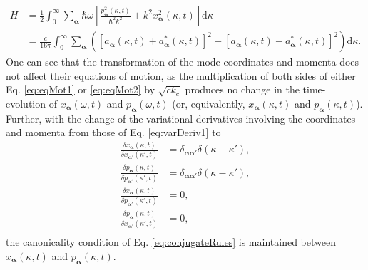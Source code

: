 \documentclass{article}
\numberwithin{equation}{section}
\begin{document}
\begin{equation}
\begin{split}
H &= \frac{1}{2}\int_0^\infty\sum_{\bm{\alpha}}\hbar\omega\left[\frac{p_{\bm{\alpha}}^2(\kappa,t)}{\hbar^2k^2} + k^2x_{\bm{\alpha}}^2(\kappa,t)\right]\mathrm{d}\kappa\\
&= \frac{c}{16\pi}\int_0^\infty\sum_{\bm{\alpha}}\left(\left[a_{\bm{\alpha}}(\kappa,t) + a_{\bm{\alpha}}^*(\kappa,t)\right]^2 - \left[a_{\bm{\alpha}}(\kappa,t) - a_{\bm{\alpha}}^*(\kappa,t)\right]^2\right)\mathrm{d}\kappa.
\end{split}
\end{equation}
One can see that the transformation of the mode coordinates and momenta does not affect their equations of motion, as the multiplication of both sides of either Eq. \eqref{eq:eqMot1} or \eqref{eq:eqMot2} by $\sqrt{ck_c}$ produces no change in the time-evolution of $x_{\bm{\alpha}}(\omega,t)$ and $p_{\bm{\alpha}}(\omega,t)$ (or, equivalently, $x_{\bm{\alpha}}(\kappa,t)$ and $p_{\bm{\alpha}}(\kappa,t)$). Further, with the change of the variational derivatives involving the coordinates and momenta from those of Eq. \eqref{eq:varDeriv1} to
\begin{equation}
\begin{split}
\frac{\delta x_{\bm{\alpha}}(\kappa,t)}{\delta x_{\bm{\alpha}'}(\kappa',t)} &= \delta_{\bm{\alpha}\bm{\alpha}'}\delta(\kappa - \kappa'),\\
\frac{\delta p_{\bm{\alpha}}(\kappa,t)}{\delta p_{\bm{\alpha}'}(\kappa',t)} &= \delta_{\bm{\alpha}\bm{\alpha}'}\delta(\kappa - \kappa'),\\
\frac{\delta x_{\bm{\alpha}}(\kappa,t)}{\delta p_{\bm{\alpha}'}(\kappa',t)} &= 0,\\
\frac{\delta p_{\bm{\alpha}}(\kappa,t)}{\delta x_{\bm{\alpha}'}(\kappa',t)} &= 0,\\
\end{split}
\end{equation}
the canonicality condition of Eq. \eqref{eq:conjugateRules} is maintained between $x_{\bm{\alpha}}(\kappa,t)$ and $p_{\bm{\alpha}}(\kappa,t)$.
\end{document}
